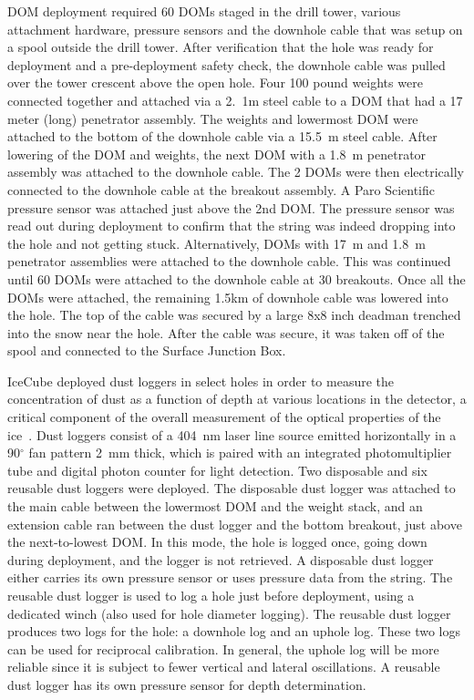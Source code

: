 DOM deployment required 60 DOMs staged in the drill tower, various attachment hardware, pressure sensors and the downhole cable that was setup on a spool outside the drill tower. After verification that the hole was ready for deployment and a pre-deployment safety check, the downhole cable was pulled over the tower crescent above the open hole. Four 100 pound weights were connected together and attached via a 2.~1m steel cable to a DOM that had a 17 meter (long) penetrator assembly. The weights and lowermost DOM were attached to the bottom of the downhole cable via a 15.5~m steel cable. After lowering of the DOM and weights, the next DOM with a 1.8~m penetrator assembly was attached to the downhole cable. The 2 DOMs were then electrically connected to the downhole cable at the breakout assembly. A Paro Scientific pressure sensor was attached just above the 2nd DOM. The pressure sensor was read out during deployment to confirm that the string was indeed dropping into the hole and not getting stuck. Alternatively, DOMs with 17~m and 1.8~m penetrator assemblies were attached to the downhole cable. This was continued until 60 DOMs were attached to the downhole cable at 30 breakouts. Once all the DOMs were attached, the remaining 1.5km of downhole cable was lowered into the hole. The top of the cable was secured by a large 8x8 inch deadman trenched into the snow near the hole. After the cable was secure, it was taken off of the spool and connected to the Surface Junction Box.

IceCube deployed dust loggers in select holes in order to measure the concentration of dust as a function of depth at various locations in the detector, a critical component of the overall measurement of the optical properties of the ice~\cite{Aartsen:2013rt,citeulike:2998650}. Dust loggers consist of a 404~nm laser line source emitted horizontally in a 90$^{\circ}$
fan pattern 2~mm thick, which is paired with an integrated
photomultiplier tube and digital photon counter for light
detection. Two disposable and six reusable dust loggers were deployed. The disposable dust logger was attached to the main cable between the lowermost DOM and the weight stack, and an extension cable ran between the dust logger and the bottom breakout, just above the next-to-lowest DOM. In this mode, the hole is logged once, going down during deployment, and the logger is not retrieved. A disposable dust logger either carries its own pressure sensor or uses pressure data from the string. The reusable dust logger is used to log a hole just before deployment, using a dedicated winch (also used for hole diameter logging). The reusable dust logger produces two logs for the hole: a downhole log and an uphole log. These two logs can be used for reciprocal calibration. In general, the uphole log will be more reliable since it is subject to fewer vertical and lateral oscillations. A reusable dust logger has its own pressure sensor for depth determination. 

